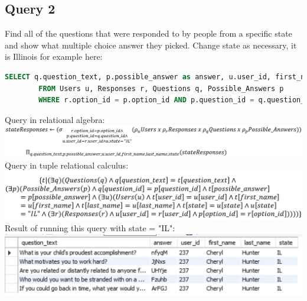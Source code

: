\documentclass[12pt, oneside]{article}
\begin{document}
    \subsection*{Query 2}
    \noindent Find all of the questions that were responded to by people from a specific state and show what multiple choice answer they picked. Change state as necessary, it is Illinois for example here:
    \begin{lstlisting}[language=SQL, columns=flexible, breaklines]
        SELECT q.question_text, p.possible_answer as answer, u.user_id, first_name, last_name, state
        FROM Users u, Responses r, Questions q, Possible_Answers p
        WHERE r.option_id = p.option_id AND p.question_id = q.question_id AND u.user_id = r.user_id AND state = "IL";
    \end{lstlisting}
    \noindent Query in relational algebra: \\
    \includegraphics[scale=0.6]{questionstatequeryalgebra.PNG}
    \noindent Query in tuple relational calculus: \\
    \includegraphics[scale=0.7]{questionstatequerycalculus3.PNG}
    Result of running this query with state = "IL":\\
    \includegraphics{questionstatequeryresult.PNG}
\end{document}
